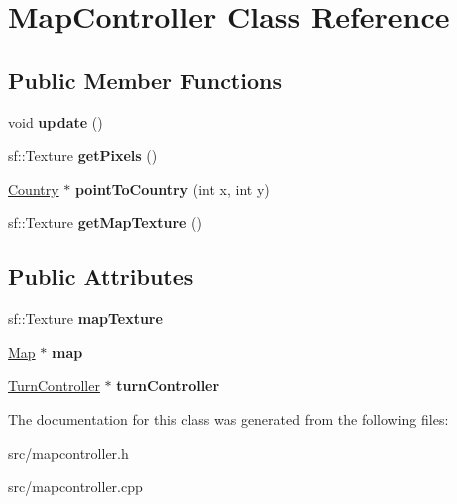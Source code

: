 \hypertarget{class_map_controller}{}\section{Map\+Controller Class Reference}
\label{class_map_controller}
\subsection*{Public Member Functions}
\begin{DoxyCompactItemize}
\item 
\hypertarget{class_map_controller_adced4bd3ec77f9b9be0dfe4d4f808780}{}void {\bfseries update} ()\label{class_map_controller_adced4bd3ec77f9b9be0dfe4d4f808780}

\item 
\hypertarget{class_map_controller_abb8a01b6107a60b4a7f6a37ac742b476}{}sf\+::\+Texture {\bfseries get\+Pixels} ()\label{class_map_controller_abb8a01b6107a60b4a7f6a37ac742b476}

\item 
\hypertarget{class_map_controller_a41e66a786f72c143fb707a9443f7d94e}{}\hyperlink{class_country}{Country} $\ast$ {\bfseries point\+To\+Country} (int x, int y)\label{class_map_controller_a41e66a786f72c143fb707a9443f7d94e}

\item 
\hypertarget{class_map_controller_a78ac4d045098a856b48d61e8e939e5aa}{}sf\+::\+Texture {\bfseries get\+Map\+Texture} ()\label{class_map_controller_a78ac4d045098a856b48d61e8e939e5aa}

\end{DoxyCompactItemize}
\subsection*{Public Attributes}
\begin{DoxyCompactItemize}
\item 
\hypertarget{class_map_controller_a1ae9ff76511baabf2d5c61133b6d5246}{}sf\+::\+Texture {\bfseries map\+Texture}\label{class_map_controller_a1ae9ff76511baabf2d5c61133b6d5246}

\item 
\hypertarget{class_map_controller_a136fc0bac51b7171f3e31505c6b90a34}{}\hyperlink{class_map}{Map} $\ast$ {\bfseries map}\label{class_map_controller_a136fc0bac51b7171f3e31505c6b90a34}

\item 
\hypertarget{class_map_controller_ac32c7f2abafb9c002cf746cf761afc56}{}\hyperlink{class_turn_controller}{Turn\+Controller} $\ast$ {\bfseries turn\+Controller}\label{class_map_controller_ac32c7f2abafb9c002cf746cf761afc56}

\end{DoxyCompactItemize}


The documentation for this class was generated from the following files\+:\begin{DoxyCompactItemize}
\item 
src/mapcontroller.\+h\item 
src/mapcontroller.\+cpp\end{DoxyCompactItemize}
